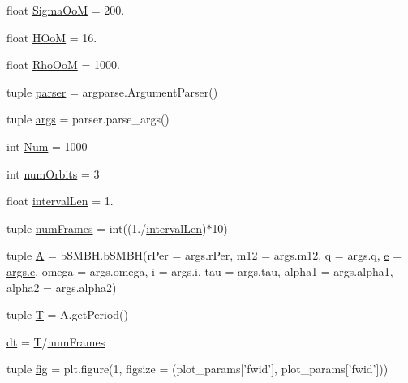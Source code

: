 \begin{DoxyCompactItemize}
\item 
float \hyperlink{namespacebinary_s_m_b_h_demo_a3f75f288ba1950c26cff588479de1a34}{Sigma\-Oo\-M} = 200.
\item 
float \hyperlink{namespacebinary_s_m_b_h_demo_a6bca186959a52214cc4eebeb4ab162e6}{H\-Oo\-M} = 16.
\item 
float \hyperlink{namespacebinary_s_m_b_h_demo_a75a0a01864a83a97da7989e85d83d7de}{Rho\-Oo\-M} = 1000.
\item 
tuple \hyperlink{namespacebinary_s_m_b_h_demo_aebac506937847b8a824a3f705785ff3c}{parser} = argparse.\-Argument\-Parser()
\item 
tuple \hyperlink{namespacebinary_s_m_b_h_demo_a0681eb689082a253783319c9ad29abc6}{args} = parser.\-parse\-\_\-args()
\item 
int \hyperlink{namespacebinary_s_m_b_h_demo_a20af80bc8ad6317c9f48f3c8974ae34e}{Num} = 1000
\item 
int \hyperlink{namespacebinary_s_m_b_h_demo_a6fd042d16c07f82a55f4f905c563c0d9}{num\-Orbits} = 3
\item 
float \hyperlink{namespacebinary_s_m_b_h_demo_af275b72ef534a7d65cad36eb28c582f5}{interval\-Len} = 1.
\item 
tuple \hyperlink{namespacebinary_s_m_b_h_demo_a2a395de684eed7859ba5e04338595253}{num\-Frames} = int((1./\hyperlink{namespacebinary_s_m_b_h_demo_af275b72ef534a7d65cad36eb28c582f5}{interval\-Len})$\ast$10)
\item 
tuple \hyperlink{namespacebinary_s_m_b_h_demo_a701565d4b7826c9a6c79feb760267d69}{A} = b\-S\-M\-B\-H.\-b\-S\-M\-B\-H(r\-Per = args.\-r\-Per, m12 = args.\-m12, q = args.\-q, \hyperlink{_constants_8cpp_ab17e17fb32b792781b807505e7f60c9c}{e} = \hyperlink{_constants_8cpp_ab17e17fb32b792781b807505e7f60c9c}{args.\-e}, omega = args.\-omega, i = args.\-i, tau = args.\-tau, alpha1 = args.\-alpha1, alpha2 = args.\-alpha2)
\item 
tuple \hyperlink{namespacebinary_s_m_b_h_demo_a6e3697d31caf5b65c8bee29546abe4ff}{T} = A.\-get\-Period()
\item 
\hyperlink{namespacebinary_s_m_b_h_demo_a0e8710373f07d4050517407141858465}{dt} = \hyperlink{namespacebinary_s_m_b_h_demo_a6e3697d31caf5b65c8bee29546abe4ff}{T}/\hyperlink{namespacebinary_s_m_b_h_demo_a2a395de684eed7859ba5e04338595253}{num\-Frames}
\item 
tuple \hyperlink{namespacebinary_s_m_b_h_demo_a52c6580cc4f2120bbe561e444362eb31}{fig} = plt.\-figure(1, figsize = (plot\-\_\-params\mbox{[}'fwid'\mbox{]}, plot\-\_\-params\mbox{[}'fwid'\mbox{]}))

\end{DoxyCompactItemize}

